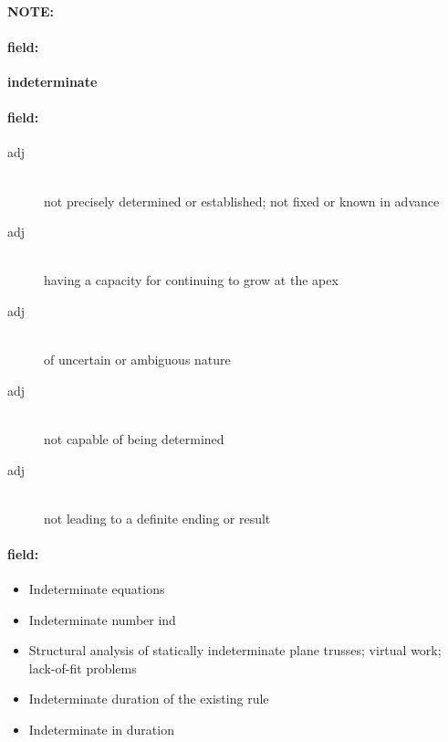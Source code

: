\documentclass[12pt]{article}
\newenvironment{note}{\paragraph{NOTE:}}{}
\newenvironment{field}{\paragraph{field:}}{}
\begin{document}
\begin{note}
\begin{field}
\textbf{\large indeterminate}
\end{field}


\begin{field}
\begin{description}
\item[adj] \hfill \\ 
not precisely determined or established; not fixed or known in advance

\item[adj] \hfill \\ 
having a capacity for continuing to grow at the apex

\item[adj] \hfill \\ 
of uncertain or ambiguous nature

\item[adj] \hfill \\ 
not capable of being determined

\item[adj] \hfill \\ 
not leading to a definite ending or result

\end{description}
\end{field}

\begin{field}
\begin{itemize}
\item Indeterminate equations
\item Indeterminate number ind
\item Structural analysis of statically indeterminate plane trusses; virtual work; lack-of-fit problems
\item Indeterminate duration of the existing rule
\item Indeterminate in duration
\end{itemize}
\end{field}
\end{note}
\end{document}
